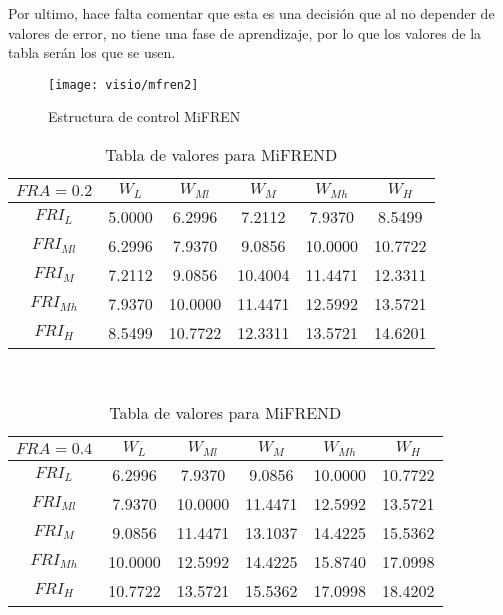     Por ultimo, hace falta comentar que esta es una decisión que al no depender de valores de error, no tiene una fase de aprendizaje, por lo que los valores de la tabla serán los que se usen.
   
    
    \begin{figure}[h]
    	\centering
    	\texttt{[image: visio/mfren2]}
    	\caption{Estructura de control MiFREN}
    	\label{fig:mfren2}
    \end{figure}
    
    
    
       \begin{table}[h]
    	\caption{Tabla de valores para MiFREND} \label{tab:betas1} 
    	\centering
    \footnotesize 
    	\begin{tabular}{|c||c|c|c|c|c|}
    		\hline
    		$FRA=0.2$	 &$W_L$&$W_{Ml}$&$W_M$&$W_{Mh}$&$W_H$\\
    		\hline  
    		\hline  
    		$FRI_L$&	 5.0000 &   6.2996 &   7.2112 & 7.9370 &  8.5499\\
    		
    		$FRI_{Ml}$&	6.2996  &  7.9370 &   9.0856 &  10.0000  & 10.7722\\
    		
    		$FRI_M$&	7.2112 &   9.0856 &  10.4004 &  11.4471 &  12.3311\\
    		
    		$FRI_{Mh}$&	7.9370 &  10.0000 &  11.4471 &  12.5992 &  13.5721\\
    		
    		$FRI_H$&	8.5499  & 10.7722 &  12.3311 &  13.5721 &  14.6201\\
    		\hline 
    	\end{tabular} \\
    	\bigskip
    	
    	
    	\begin{tabular}{|c||c|c|c|c|c|}
    		\hline
	   		$FRA=0.4$	 &$W_L$&$W_{Ml}$&$W_M$&$W_{Mh}$&$W_H$\\
    		\hline  
    		\hline  
    		$FRI_L$&6.2996&    7.9370  &  9.0856   &10.0000 &  10.7722\\
    		$FRI_{Ml}$&7.9370  & 10.0000 &  11.4471 &  12.5992 &  13.5721\\
    		$FRI_M$&9.0856  & 11.4471  & 13.1037 &  14.4225  & 15.5362\\
    		$FRI_{Mh}$&10.0000 &  12.5992  & 14.4225&   15.8740  & 17.0998\\
    		$FRI_H$&10.7722 &  13.5721  & 15.5362&   17.0998  & 18.4202\\
    		\hline 
    	\end{tabular} 
    	\bigskip
    	\\
    	

\end{table}
